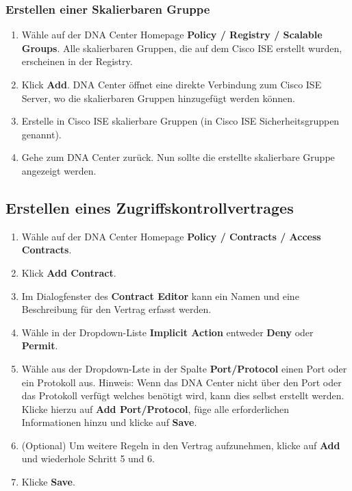 \subsubsection{Erstellen einer Skalierbaren Gruppe}
\begin{enumerate}
	\item Wähle auf der DNA Center Homepage \textbf{Policy / Registry / Scalable Groups}. Alle skalierbaren Gruppen, die auf dem Cisco ISE erstellt wurden, erscheinen in der Registry.
	\item Klick \textbf{Add}. DNA Center öffnet eine direkte Verbindung zum Cisco ISE Server, wo die skalierbaren Gruppen hinzugefügt werden können.
	\item Erstelle in Cisco ISE skalierbare Gruppen (in Cisco ISE Sicherheitsgruppen genannt).
	\item Gehe zum DNA Center zurück. Nun sollte die erstellte skalierbare Gruppe angezeigt werden.
\end{enumerate}

\subsection{Erstellen eines Zugriffskontrollvertrages}
\begin{enumerate}
	\item Wähle auf der DNA Center Homepage \textbf{Policy / Contracts / Access Contracts}.
	\item Klick \textbf{Add Contract}.
	\item Im Dialogfenster des \textbf{Contract Editor} kann ein Namen und eine Beschreibung für den Vertrag erfasst werden.
	\item Wähle in der Dropdown-Liste \textbf{Implicit Action} entweder \textbf{Deny} oder \textbf{Permit}.
	\item Wähle aus der Dropdown-Lste in der Spalte \textbf{Port/Protocol} einen Port oder ein Protokoll aus. Hinweis: Wenn das DNA Center nicht über den Port oder das Protokoll verfügt welches benötigt wird, kann dies selbst erstellt werden. Klicke hierzu auf \textbf{Add Port/Protocol}, füge alle erforderlichen Informationen hinzu und klicke auf \textbf{Save}.
	\item (Optional) Um weitere Regeln in den Vertrag aufzunehmen, klicke auf \textbf{Add} und wiederhole Schritt 5 und 6.
	\item Klicke \textbf{Save}.
\end{enumerate}